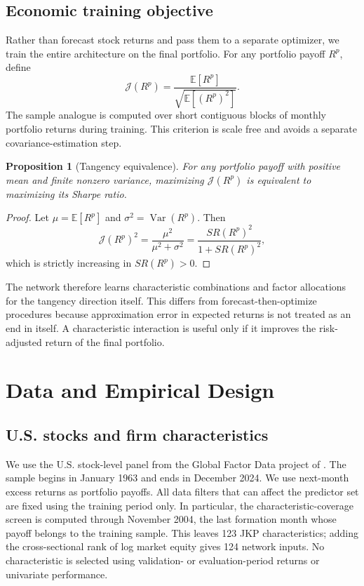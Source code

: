 \documentclass[12pt]{article}
\newtheorem{proposition}{Proposition}
\begin{document}
\subsection{Economic training objective}
Rather than forecast stock returns and pass them to a separate optimizer, we train the entire architecture on the final portfolio. For any portfolio payoff $R^p$, define
\begin{equation}
\mathcal{J}(R^p)=\frac{\mathbb{E}[R^p]}{\sqrt{\mathbb{E}[(R^p)^2]}}.
\label{eq:tangency_score}
\end{equation}
The sample analogue is computed over short contiguous blocks of monthly portfolio returns during training. This criterion is scale free and avoids a separate covariance-estimation step.
\begin{proposition}[Tangency equivalence]
For any portfolio payoff with positive mean and finite nonzero variance, maximizing $\mathcal{J}(R^p)$ is equivalent to maximizing its Sharpe ratio.
\end{proposition}
\begin{proof}
Let $\mu=\mathbb{E}[R^p]$ and $\sigma^2=\operatorname{Var}(R^p)$. Then
\[
\mathcal{J}(R^p)^2=\frac{\mu^2}{\mu^2+\sigma^2}
=\frac{SR(R^p)^2}{1+SR(R^p)^2},
\]
which is strictly increasing in $SR(R^p)>0$.
\end{proof}

The network therefore learns characteristic combinations and factor allocations for the tangency direction itself. This differs from forecast-then-optimize procedures because approximation error in expected returns is not treated as an end in itself. A characteristic interaction is useful only if it improves the risk-adjusted return of the final portfolio.



\section{Data and Empirical Design}\label{sec:data}
\subsection{U.S. stocks and firm characteristics}
We use the U.S. stock-level panel from the Global Factor Data project of \citet{jensen2023replication}. The sample begins in January 1963 and ends in December 2024. We use next-month excess returns as portfolio payoffs. All data filters that can affect the predictor set are fixed using the training period only. In particular, the characteristic-coverage screen is computed through November 2004, the last formation month whose payoff belongs to the training sample. This leaves 123 JKP characteristics; adding the cross-sectional rank of log market equity gives 124 network inputs. No characteristic is selected using validation- or evaluation-period returns or univariate performance.
\end{document}

